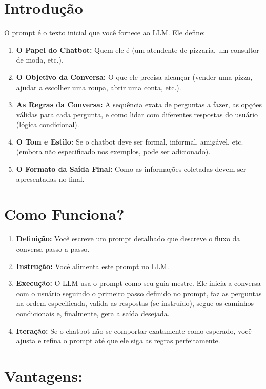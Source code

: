 \documentclass[14pt,a4paper,oneside]{book}
\begin{document}
\section{Introdução}

O prompt é o texto inicial que você fornece ao LLM. Ele define:

\begin{enumerate}
    \item \textbf{O Papel do Chatbot:} Quem ele é (um atendente de pizzaria, um consultor de moda, etc.).
    \item \textbf{O Objetivo da Conversa:} O que ele precisa alcançar (vender uma pizza, ajudar a escolher uma roupa, abrir uma conta, etc.).
    \item \textbf{As Regras da Conversa:} A sequência exata de perguntas a fazer, as opções válidas para cada pergunta, e como lidar com diferentes respostas do usuário (lógica condicional).
    \item \textbf{O Tom e Estilo:} Se o chatbot deve ser formal, informal, amigável, etc. (embora não especificado nos exemplos, pode ser adicionado).
    \item \textbf{O Formato da Saída Final:} Como as informações coletadas devem ser apresentadas no final.
\end{enumerate}

\section*{Como Funciona?}

\begin{enumerate}
    \item \textbf{Definição:} Você escreve um prompt detalhado que descreve o fluxo da conversa passo a passo.
    \item \textbf{Instrução:} Você alimenta este prompt no LLM.
    \item \textbf{Execução:} O LLM usa o prompt como seu guia mestre. Ele inicia a conversa com o usuário seguindo o primeiro passo definido no prompt, faz as perguntas na ordem especificada, valida as respostas (se instruído), segue os caminhos condicionais e, finalmente, gera a saída desejada.
    \item \textbf{Iteração:} Se o chatbot não se comportar exatamente como esperado, você ajusta e refina o prompt até que ele siga as regras perfeitamente.
\end{enumerate}

\section*{Vantagens:}
\end{document}
